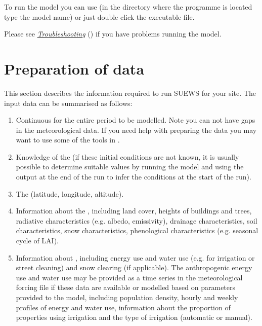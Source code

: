 \documentclass[letterpaper,10pt,english]{sphinxmanual}
\begin{document}
To run the model you can use  (in the directory where
the programme is located type the model name) or just double click the
executable file.

Please see {\hyperref[\detokenize{prepare-to-run-the-model:Troubleshooting}]{\emph{Troubleshooting}}} () if you have problems
running the model.


\section{Preparation of data}
\label{\detokenize{prepare-to-run-the-model:preparation-of-data}}
This section describes the information required to run SUEWS for your
site. The input data can be summarised as follows:
\begin{enumerate}
\item {} 
Continuous  for the entire period to be
modelled. Note you can not have gaps in the meteorological data. If
you need help with preparing the data you may want to use some of the
tools in
.

\item {} 
Knowledge of the  (if these initial conditions are not known, it is
usually possible to determine suitable values by running the model
and using the output at the end of the run to infer the conditions at
the start of the run).

\item {} 
The  (latitude, longitude, altitude).

\item {} 
Information about the , including
land cover, heights of buildings and trees, radiative characteristics
(e.g. albedo, emissivity), drainage characteristics, soil
characteristics, snow characteristics, phenological characteristics
(e.g. seasonal cycle of LAI).

\item {} 
Information about , including energy use and water
use (e.g. for irrigation or street cleaning) and snow clearing (if
applicable). The anthropogenic energy use and water use may be
provided as a time series in the meteorological forcing file if these
data are available or modelled based on parameters provided to the
model, including population density, hourly and weekly profiles of
energy and water use, information about the proportion of properties
using irrigation and the type of irrigation (automatic or manual).

\end{enumerate}
\end{document}
